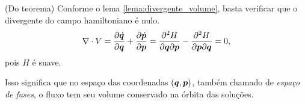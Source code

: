 \begin{Proof} (Do teorema)
    Conforme o lema \ref{lema:divergente_volume}, basta verificar que o divergente do campo hamiltoniano é nulo.
    \begin{equation*}
        \nabla \cdot V 
        = \dfrac{\partial \dot {\bm q}}{\partial \bm q} + \dfrac{\partial \dot {\bm p}}{\partial \bm p}
        = \dfrac{\partial^2 H}{\partial \bm q \partial \bm p} - \dfrac{\partial^2 H}{\partial \bm p \partial \bm q} = 0,
    \end{equation*}
    pois $H$ é suave.
\end{Proof}

Isso significa que no espaço das coordenadas $(\bm q, \bm p)$, também chamado de \textit{espaço de fases}, o fluxo tem seu volume conservado na órbita das soluções.
